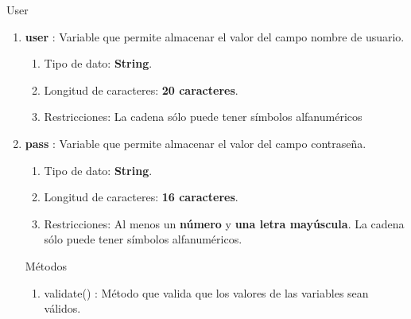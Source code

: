 \documentclass[12pt, a4paper, titlepage]{report}
\begin{document}
			    
			    User
			    \begin{enumerate}
    		        \item \textbf{user} : Variable que permite almacenar el valor del campo nombre de usuario.
    		        \begin{enumerate}
    		            \item Tipo de dato: \textbf{String}. \item Longitud de caracteres: \textbf{20 caracteres}.
    		            \item Restricciones: La cadena sólo puede tener símbolos alfanuméricos 
    		        \end{enumerate}
    		        \item \textbf{pass} : Variable que permite almacenar el valor del campo contraseña.
    		        \begin{enumerate}
    		            \item Tipo de dato: \textbf{String}. \item Longitud de caracteres: \textbf{16 caracteres}.
    		            \item Restricciones: Al menos un \textbf{número} y \textbf{una letra mayúscula}. La cadena sólo puede tener símbolos alfanuméricos.
    		        \end{enumerate}
    		        
    		        Métodos
    		        
    		        \begin{enumerate}
    		            \item validate() : Método que valida que los valores de las variables sean válidos.
    		        \end{enumerate}
			    \end{enumerate}
			        
\end{document}
